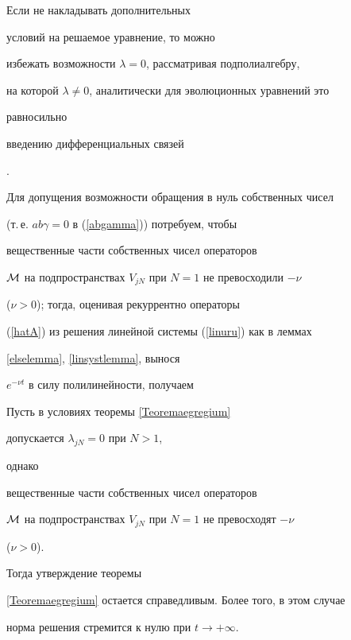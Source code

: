 Если не накладывать дополнительных


условий на решаемое уравнение, то можно


избежать возможности $\lambda=0$, рассматривая подполиалгебру,


на которой $\lambda\neq0$, аналитически для эволюционных уравнений это


равносильно


введению дифференциальных связей


\cite{SidorovShapeevYanenko}.


Для допущения возможности обращения в нуль собственных чисел


(т.\,е. $ab\gamma=0$ в (\ref{abgamma})) потребуем, чтобы


вещественные части собственных чисел операторов


${\cal{M}}$ на подпространствах $V_{jN}$ при $N=1$ не превосходили $-\nu$


($\nu>0$); тогда, оценивая рекуррентно операторы


(\ref{hatA}) из решения линейной системы (\ref{linuru}) как в леммах


\ref{elselemma}, \ref{linsystlemma}, вынося


$e^{-\nu t}$ в силу полилинейности, получаем





\begin{cor}


Пусть в условиях теоремы \ref{Teoremaegregium}


допускается $\lambda_{jN}=0$ при $N>1$,


однако


вещественные части собственных чисел операторов


${\cal{M}}$ на подпространствах $V_{jN}$ при $N=1$ не превосходят $-\nu$


($\nu>0$).


Тогда утверждение теоремы


\ref{Teoremaegregium} остается справедливым. Более того, в этом случае


норма решения стремится к нулю при $t\rightarrow+\infty$.


\end{cor}





